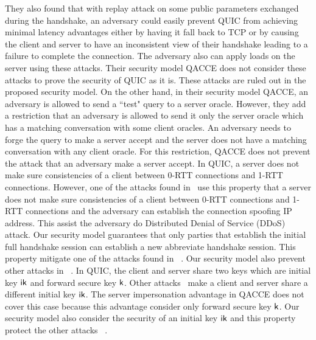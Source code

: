 They also found that with replay attack on some
public parameters exchanged during the handshake, an
adversary could easily prevent QUIC from achieving
minimal latency advantages either by having it fall back
to TCP or by causing the client and server to have an
inconsistent view of their handshake leading to a failure
to complete the connection.
The adversary also can apply loads on the server using
these attacks.
Their security model QACCE does not consider these attacks
to prove the security of QUIC as it is.
These attacks are ruled out in the proposed security model.
On the other hand, in their security model QACCE, an adversary
is allowed to send a ``test" query to a server oracle.
However, they add a restriction that an adversary is allowed
to send it only the server oracle which has a matching
conversation with some client oracles.
An adversary needs to forge the query to make a server accept
and the server does not have a matching conversation with any
client oracle.
For this restriction, QACCE does not prevent the attack that
an adversary make a server accept.
In QUIC, a server does not make sure consistencies of a client
between 0-RTT connections and 1-RTT connections.
However, one of the attacks found in~\cite{LJBN15:QUIC} use this
property that a server does not make sure consistencies of a client
between 0-RTT connections and 1-RTT connections and the adversary
can establish the connection spoofing IP address.
This assist the adversary do Distributed Denial of Service
(DDoS) attack.
Our security model guarantees that only parties
that establish the initial full handshake session can
establish a new abbreviate handshake session.
This property mitigate one of the attacks found in
~\cite{LJBN15:QUIC}.
Our security model also prevent other attacks in
~\cite{LJBN15:QUIC}.
In QUIC, the client and server share two keys which are initial
key $\mathsf{ik}$ and forward secure key $\mathsf{k}$.
Other attacks~\cite{LJBN15:QUIC} make a client and server share
a different initial key $\mathsf{ik}$.
The server impersonation advantage in QACCE does not
cover this case because this advantage consider only forward
secure key $\mathsf{k}$.
Our security model also consider the security of an initial
key $\mathsf{ik}$ and this property protect the other attacks
~\cite{LJBN15:QUIC}.

